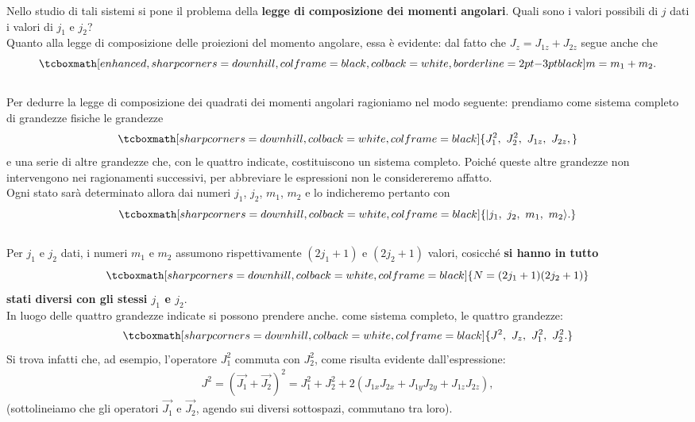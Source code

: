 \documentclass[a4paper,12pt,oneside]{book}
\begin{document}
Nello studio di tali sistemi si pone il problema della \textbf{legge di composizione dei momenti angolari}. Quali sono i valori possibili di $j$ dati i valori di $j_1$ e $j_2$? \\

Quanto alla legge di composizione delle proiezioni del momento angolare, essa è evidente: dal fatto che $J_z = J_{1z} + J_{2z}$ segue anche che 
	\begin{equation}
		\label{eq:cap19_02}
		\tcboxmath[enhanced, sharp corners=downhill, colframe=black, colback=white, borderline={2pt}{-3pt}{black}]{
			m= m_1 + m_2.
			}
	\end{equation}\\
	
Per dedurre la legge di composizione dei quadrati dei momenti angolari ragioniamo nel modo seguente: prendiamo come sistema completo di grandezze fisiche le grandezze
	\begin{equation}
		\tcboxmath[sharp corners=downhill, colback=white, colframe=black]{
			J_1^2 ,~ J_2^2 ,~ J_{1z} ,~ J_{2z} ,
			}
	\end{equation}
e una serie di altre grandezze che, con le quattro indicate, costituiscono un sistema completo. Poiché queste altre grandezze non intervengono nei ragionamenti successivi, per abbreviare le espressioni non le considereremo affatto.\\

Ogni stato sarà determinato allora dai numeri $j_1$, $j_2$, $m_1$, $ m_2$ e lo indicheremo pertanto con
	\begin{equation}
		\tcboxmath[sharp corners=downhill, colback=white, colframe=black]{
			| j_1 , ~ j_2 ,~ m_1 ,~ m_2 \rangle .
			}
	\end{equation}\\
	
Per $j_1$ e $j_2$ dati, i numeri $m_1$ e $m_2$ assumono rispettivamente $(2 j_1 + 1)$ e $(2 j_2 + 1)$ valori, cosicché \textbf{si hanno in tutto}
	\begin{equation} \label{eq:cap19_03}
		\tcboxmath[sharp corners=downhill, colback=white, colframe=black]{
			N= (2j_1 + 1) (2j_2 + 1) 
			}
	\end{equation}
\textbf{stati diversi con gli stessi $j_1$ e $j_2$}. \\

In luogo delle quattro grandezze indicate si possono prendere anche. come sistema completo, le quattro grandezze:
	\begin{equation}
		\tcboxmath[sharp corners=downhill, colback=white, colframe=black]{
			J^2 ,~ J_z ,~ J_1^2 ,~ J_2^2 . 
			}
	\end{equation}
Si trova infatti che, ad esempio, l'operatore $J_1^2$  commuta con $J_2^2$, come risulta evidente dall'espressione:
	\begin{align}
		J^2 = (\vec{J_1} + \vec{J_2})^2 = J_1^2 + J_2^2 + 2 (J_{1x} J_{2x} + J_{1y} J_{2y} + J_{1z} J_{2z}),
	\end{align}
(sottolineiamo che gli operatori $\vec{J_1}$ e $\vec{J_2}$, agendo sui diversi sottospazi, commutano tra loro).\\
\end{document}
